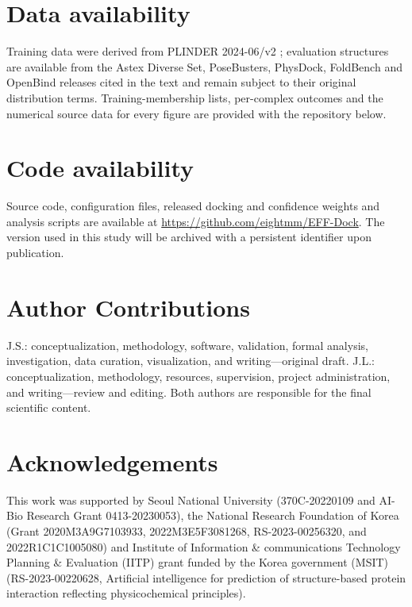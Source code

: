 \documentclass{article}
\newcommand{\citep}[1]{\cite{#1}}
\begin{document}
\section*{Data availability}

Training data were derived from PLINDER 2024-06/v2 \citep{durairaj2024plinder}; evaluation structures are available from the Astex Diverse Set, PoseBusters, PhysDock, FoldBench and OpenBind releases cited in the text and remain subject to their original distribution terms. Training-membership lists, per-complex outcomes and the numerical source data for every figure are provided with the repository below.

\section*{Code availability}

Source code, configuration files, released docking and confidence weights and analysis scripts are available at \href{https://github.com/eightmm/EFF-Dock}{https://github.com/eightmm/EFF-Dock}. The version used in this study will be archived with a persistent identifier upon publication.

\section*{Author Contributions}

J.S.: conceptualization, methodology, software, validation, formal analysis, investigation, data curation, visualization, and writing---original draft.
J.L.: conceptualization, methodology, resources, supervision, project administration, and writing---review and editing.
Both authors are responsible for the final scientific content.

\section*{Acknowledgements}

\begin{sloppypar}
This work was supported by Seoul National University (370C-20220109 and AI-Bio Research Grant 0413-20230053), the National Research Foundation of Korea (Grant 2020M3A9G7103933, 2022M3E5F3081268, RS-2023-00256320, and 2022R1C1C1005080) and Institute of Information \& communications Technology Planning \& Evaluation (IITP) grant funded by the Korea government (MSIT) (RS-2023-00220628, Artificial intelligence for prediction of structure-based protein interaction reflecting physicochemical principles).
\end{sloppypar}
\end{document}
